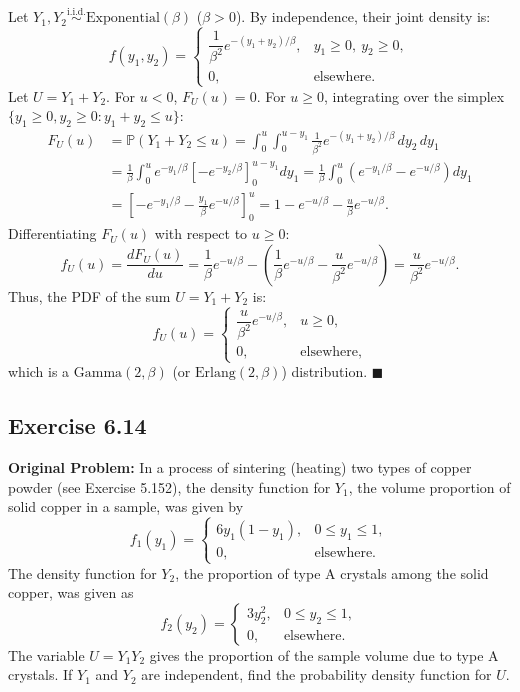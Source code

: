 \documentclass[11pt, letterpaper]{article}
\theoremstyle{definition}
\theoremstyle{remark}
\newcommand{\Prob}{\mathbb{P}}
\begin{document}
Let $Y_1, Y_2 \stackrel{\text{i.i.d.}}{\sim} \text{Exponential}(\beta)$ ($\beta > 0$). By independence, their joint density is:
\[
    f(y_1, y_2) = \begin{cases} \dfrac{1}{\beta^2} e^{-(y_1 + y_2)/\beta}, & y_1 \ge 0, \ y_2 \ge 0, \\[6pt] 0, & \text{elsewhere.} \end{cases}
\]
Let $U = Y_1 + Y_2$. For $u < 0$, $F_U(u) = 0$. For $u \ge 0$, integrating over the simplex $\{y_1 \ge 0, y_2 \ge 0 : y_1 + y_2 \le u\}$:
\begin{align*}
    F_U(u) &= \Prob(Y_1 + Y_2 \le u) = \int_{0}^{u} \int_{0}^{u - y_1} \frac{1}{\beta^2} e^{-(y_1 + y_2)/\beta}\,dy_2\,dy_1 \\
    &= \frac{1}{\beta} \int_{0}^{u} e^{-y_1/\beta} \left[ -e^{-y_2/\beta} \right]_{0}^{u - y_1} dy_1 = \frac{1}{\beta} \int_{0}^{u} \left(e^{-y_1/\beta} - e^{-u/\beta}\right) dy_1 \\
    &= \left[ -e^{-y_1/\beta} - \frac{y_1}{\beta}e^{-u/\beta} \right]_{0}^{u} = 1 - e^{-u/\beta} - \frac{u}{\beta}e^{-u/\beta}.
\end{align*}
Differentiating $F_U(u)$ with respect to $u \ge 0$:
\[
    f_U(u) = \frac{dF_U(u)}{du} = \frac{1}{\beta}e^{-u/\beta} - \left(\frac{1}{\beta}e^{-u/\beta} - \frac{u}{\beta^2}e^{-u/\beta}\right) = \frac{u}{\beta^2}e^{-u/\beta}.
\]
Thus, the PDF of the sum $U = Y_1 + Y_2$ is:
\[
    f_U(u) = \begin{cases} \dfrac{u}{\beta^2}e^{-u/\beta}, & u \ge 0, \\[6pt] 0, & \text{elsewhere,} \end{cases}
\]
which is a $\text{Gamma}(2, \beta)$ (or $\text{Erlang}(2, \beta)$) distribution. \hfill $\blacksquare$

\subsection{Exercise 6.14}

\textbf{Original Problem:}
In a process of sintering (heating) two types of copper powder (see Exercise 5.152), the density function for $Y_1$, the volume proportion of solid copper in a sample, was given by
\[
    f_1(y_1) = \begin{cases} 6y_1(1 - y_1), & 0 \le y_1 \le 1, \\ 0, & \text{elsewhere.} \end{cases}
\]
The density function for $Y_2$, the proportion of type A crystals among the solid copper, was given as
\[
    f_2(y_2) = \begin{cases} 3y_2^2, & 0 \le y_2 \le 1, \\ 0, & \text{elsewhere.} \end{cases}
\]
The variable $U = Y_1 Y_2$ gives the proportion of the sample volume due to type A crystals. If $Y_1$ and $Y_2$ are independent, find the probability density function for $U$.
\end{document}
